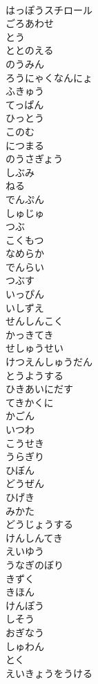 \documentclass[8pt]{extreport}
\begin{document}
\begin{CJK}{UTF8}{min}
\\	はっぽうスチロール
\\	ごろあわせ
\\	とう
\\	ととのえる
\\	のうみん
\\	ろうにゃくなんにょ
\\	ふきゅう
\\	てっぱん
\\	ひっとう
\\	このむ
\\	につまる
\\	のうさぎょう
\\	しぶみ
\\	ねる
\\	でんぷん
\\	しゅじゅ
\\	つぶ
\\	こくもつ
\\	なめらか
\\	でんらい
\\	つぶす
\\	いっぴん
\\	いしずえ
\\	せんしんこく
\\	かっきてき
\\	せしゅうせい
\\	けつえんしゅうだん
\\	とうようする
\\	ひきあいにだす
\\	てきかくに
\\	かごん
\\	いつわ
\\	こうせき
\\	うらぎり
\\	ひぼん
\\	どうぜん
\\	ひげき
\\	みかた
\\	どうじょうする
\\	けんしんてき
\\	えいゆう
\\	うなぎのぼり
\\	きずく
\\	きほん
\\	けんぽう
\\	しそう
\\	おぎなう
\\	しゅわん
\\	とく
\\	えいきょうをうける

\end{CJK}
\end{document}
